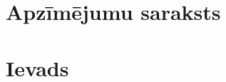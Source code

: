 \documentclass[12pt]{report}
\begin{document}

\setcounter{secnumdepth}{-1}

\clearpage

\cleardoublepage
{}
\tableofcontents
\cleardoublepage
{}

\setcounter{page}{1}

\setcounter{secnumdepth}{-1}
\chapter{Apzīmējumu saraksts}



\setcounter{secnumdepth}{-1}
\chapter{Ievads}


\setcounter{secnumdepth}{2}
\setcounter{chapter}{0}

\chapter{\@nodone}\label{chap:chapter_1} 

\chapter{\@nodtwo}\label{chap:chapter_2} %




\chapter{\@nodthree}\label{chap:chapter_3} %


\chapter{\@nodfour}\label{chap:chapter_4} %


%
\end{document}
